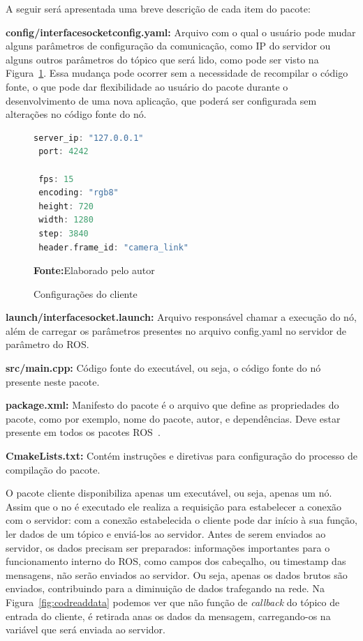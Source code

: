 A seguir será apresentada uma breve descrição de cada item do pacote:
 
\textbf{config/interface\underline{\hspace{.07in}}socket\underline{\hspace{.07in}}config.yaml:} Arquivo com o qual o usuário pode mudar alguns parâmetros de configuração da comunicação, como IP do servidor ou alguns outros parâmetros do tópico que será lido, como pode ser visto na Figura~\ref{fig:codigoconfig}. Essa mudança pode ocorrer sem a necessidade de recompilar o código fonte, o que pode dar flexibilidade ao usuário do pacote durante o desenvolvimento de uma nova aplicação, que poderá ser configurada sem alterações no código fonte do nó. 

\begin{figure}[ht]
\caption{Configurações do cliente}
\begin{center}
\begin{lstlisting}[language=C++, backgroundcolor=\color{gray!10}]
 server_ip: "127.0.0.1"
 port: 4242

 fps: 15
 encoding: "rgb8"
 height: 720
 width: 1280
 step: 3840
 header.frame_id: "camera_link"
\end{lstlisting}
{\small \textbf{Fonte:}Elaborado pelo autor}	
\end{center}\label{fig:codigoconfig}
\end{figure}
	

\textbf{launch/interface\underline{\hspace{.07in}}socket.launch:} Arquivo responsável chamar a execução do nó, além de carregar os parâmetros presentes no arquivo config.yaml no servidor de parâmetro do ROS\@.

\textbf{src/main.cpp:} Código fonte do executável, ou seja, o código fonte do nó presente neste pacote.

\textbf{package.xml:} Manifesto do pacote é o arquivo que define as propriedades do pacote, como por exemplo, nome do pacote, autor, e dependências. Deve estar presente em todos os pacotes ROS~\cite{RosPkgXml}.


\textbf{CmakeLists.txt:} Contém instruções e diretivas para configuração do processo de compilação do pacote.

O pacote cliente disponibiliza apenas um executável, ou seja, apenas um nó. Assim que o no é executado ele realiza a requisição para estabelecer a conexão com o servidor: com a conexão estabelecida o cliente pode dar início à sua função, ler dados de um tópico e enviá-los ao servidor. Antes de serem enviados ao servidor, os dados precisam ser preparados: informações importantes para o funcionamento interno do ROS, como campos dos cabeçalho, ou timestamp das mensagens, não serão enviados ao servidor. Ou seja, apenas os dados brutos são enviados, contribuindo para a diminuição de dados trafegando na rede. Na Figura~\ref{fig:codreaddata} podemos ver que não função de \textit{callback} do tópico de entrada do cliente, é retirada anas os dados da mensagem, carregando-os na variável que será enviada ao servidor.

